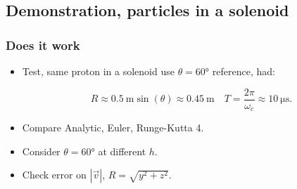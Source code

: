\documentclass{beamer}
\begin{document}
\subsection{Demonstration, particles in a solenoid}

\begin{frame}
\frametitle{Does it work}
\begin{itemize}

\item<1-> Test, same proton in a solenoid use $\theta=\ang{60}$ reference, had:

\begin{equation*}
R \approx \SI{0.5}{\meter}\sin(\theta)\approx \SI{0.45}{\meter} \quad T=\frac{2\pi}{\omega_c} \approx \SI{10}{\micro\second}.
\end{equation*}

\item<2-> Compare Analytic, Euler, Runge-Kutta 4.

\item<3-> Consider $\theta=\ang{60}$ at different $h$.

\item<4-> Check error on $|\vec{v}|$, $R=\sqrt{y^2+z^2}$.
\end{itemize}
\end{frame}


\makeatletter
{}
\makeatother
\end{document}
